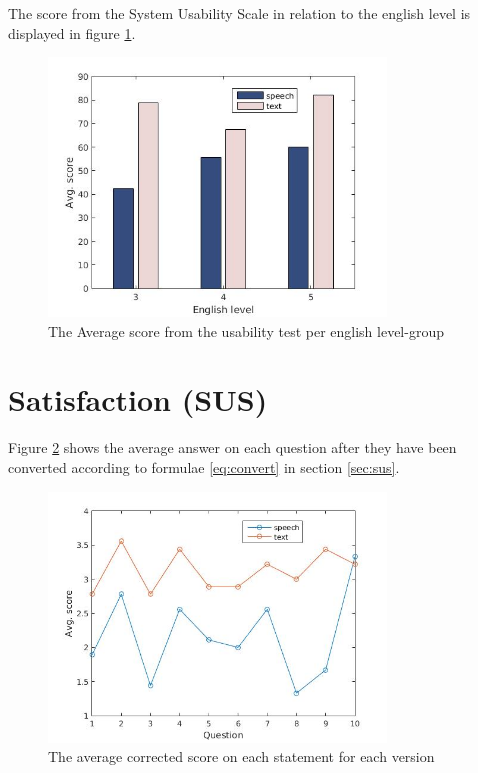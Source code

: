 The score from the System Usability Scale in relation to the english level is displayed in figure \ref{eng_score}.
\begin{figure}[ht]
  \centering
  \includegraphics[width=0.8\textwidth]{images/english_score.jpg}
  \caption{The Average score from the usability test per english level-group}\label{eng_score}
\end{figure}


\section{Satisfaction (SUS)}
Figure \ref{fig:sus_table} shows the average answer on each question after they have been converted according to formulae \ref{eq:convert} in section \ref{sec:sus}. 
\begin{figure}[ht]
  \centering
  \includegraphics[width=0.8\textwidth]{images/sus.jpg}
  \caption{The average corrected score on each statement for each version}\label{fig:sus_table}
\end{figure}

